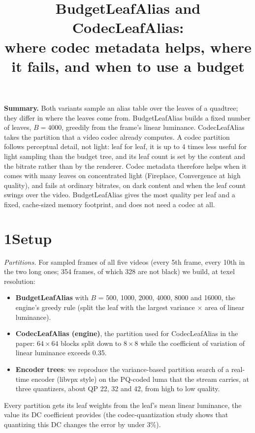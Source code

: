 \documentclass[10pt]{article}
\title{\vspace{-1.6em}BudgetLeafAlias and CodecLeafAlias:\\ where codec metadata helps, where it fails, and when to use a budget}
\author{}
\date{\vspace{-2.4em}}
\begin{document}
\maketitle
\vspace{-1.0em}

\textbf{Summary.} Both variants sample an alias table over the leaves of a quadtree; they differ in where the leaves come from. BudgetLeafAlias builds a fixed number of leaves, $B=4000$, greedily from the frame's linear luminance. CodecLeafAlias takes the partition that a video codec already computes. A codec partition follows perceptual detail, not light: leaf for leaf, it is up to 4 times less useful for light sampling than the budget tree, and its leaf count is set by the content and the bitrate rather than by the renderer. Codec metadata therefore helps when it comes with many leaves on concentrated light (Fireplace, Convergence at high quality), and fails at ordinary bitrates, on dark content and when the leaf count swings over the video. BudgetLeafAlias gives the most quality per leaf and a fixed, cache-sized memory footprint, and does not need a codec at all.

\section*{1\quad Setup}

\emph{Partitions.} For sampled frames of all five videos (every 5th frame, every 10th in the two long ones; 354 frames, of which 328 are not black) we build, at texel resolution:
\begin{itemize}\setlength{\itemsep}{0pt}
\item \textbf{BudgetLeafAlias} with $B$ = 500, 1000, 2000, 4000, 8000 and 16000, the engine's greedy rule (split the leaf with the largest variance $\times$ area of linear luminance).
\item \textbf{CodecLeafAlias (engine)}, the partition used for CodecLeafAlias in the paper: $64\times64$ blocks split down to $8\times8$ while the coefficient of variation of linear luminance exceeds 0.35.
\item \textbf{Encoder trees}: we reproduce the variance-based partition search of a real-time encoder (libvpx style) on the PQ-coded luma that the stream carries, at three quantizers, about QP 22, 32 and 42, from high to low quality.
\end{itemize}
Every partition gets its leaf weights from the leaf's mean linear luminance, the value its DC coefficient provides (the codec-quantization study shows that quantizing this DC changes the error by under 3\%).
\end{document}
